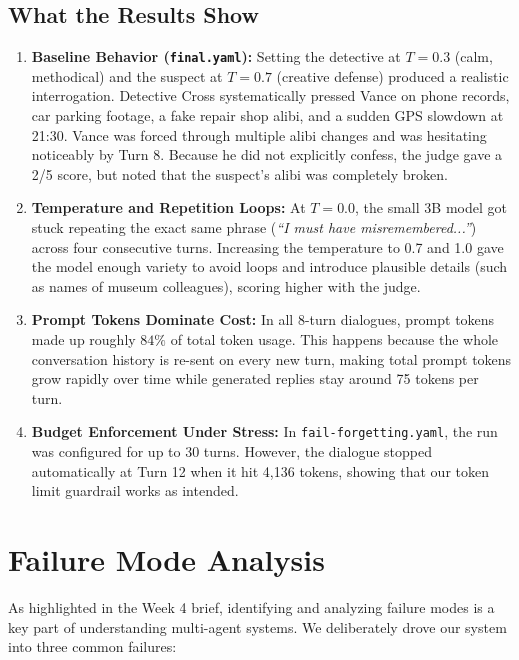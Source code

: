 \documentclass[11pt,a4paper]{article}
\begin{document}
\subsection{What the Results Show}
\begin{enumerate}
    \item \textbf{Baseline Behavior (\texttt{final.yaml}):} Setting the detective at $T=0.3$ (calm, methodical) and the suspect at $T=0.7$ (creative defense) produced a realistic interrogation. Detective Cross systematically pressed Vance on phone records, car parking footage, a fake repair shop alibi, and a sudden GPS slowdown at 21:30. Vance was forced through multiple alibi changes and was hesitating noticeably by Turn 8. Because he did not explicitly confess, the judge gave a 2/5 score, but noted that the suspect's alibi was completely broken.
    \item \textbf{Temperature and Repetition Loops:} At $T=0.0$, the small 3B model got stuck repeating the exact same phrase (\textit{``I must have misremembered...''}) across four consecutive turns. Increasing the temperature to 0.7 and 1.0 gave the model enough variety to avoid loops and introduce plausible details (such as names of museum colleagues), scoring higher with the judge.
    \item \textbf{Prompt Tokens Dominate Cost:} In all 8-turn dialogues, prompt tokens made up roughly $84\%$ of total token usage. This happens because the whole conversation history is re-sent on every new turn, making total prompt tokens grow rapidly over time while generated replies stay around 75 tokens per turn.
    \item \textbf{Budget Enforcement Under Stress:} In \texttt{fail-forgetting.yaml}, the run was configured for up to 30 turns. However, the dialogue stopped automatically at Turn 12 when it hit 4,136 tokens, showing that our token limit guardrail works as intended.
\end{enumerate}

\section{Failure Mode Analysis}
\label{sec:failures}

As highlighted in the Week 4 brief, identifying and analyzing failure modes is a key part of understanding multi-agent systems. We deliberately drove our system into three common failures:
\end{document}
